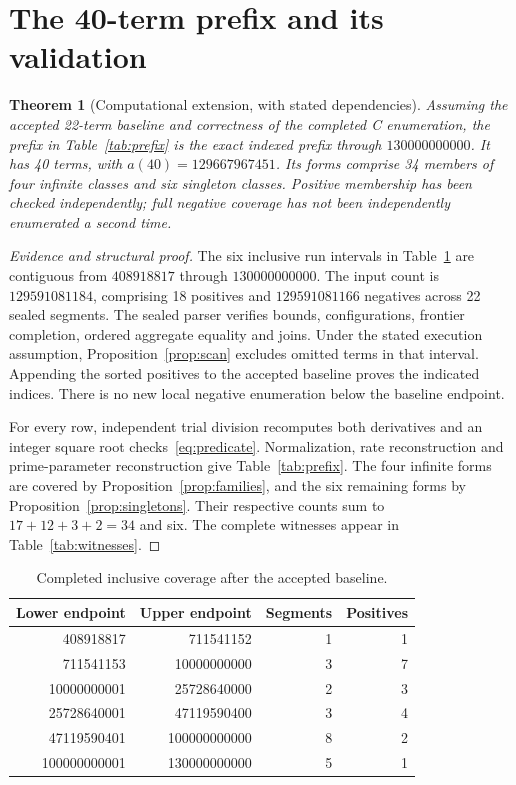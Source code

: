 \documentclass[11pt]{article}
\newtheorem{theorem}{Theorem}[section]
\theoremstyle{definition}
\begin{document}
\section{The 40-term prefix and its validation}\label{sec:extension}
\begin{theorem}[Computational extension, with stated dependencies]
\label{thm:extension}
Assuming the accepted 22-term baseline and correctness of the completed C
enumeration, the prefix in Table~\ref{tab:prefix} is the exact indexed
prefix through $130000000000$. It has 40 terms, with
$a(40)=129667967451$. Its forms comprise 34 members of four infinite
classes and six singleton classes. Positive membership has been checked
independently; full negative coverage has not been independently
enumerated a second time.
\end{theorem}
\begin{proof}[Evidence and structural proof]
The six inclusive run intervals in Table~\ref{tab:coverage} are contiguous
from $408918817$ through $130000000000$. The input count is
$129591081184$, comprising 18 positives and $129591081166$ negatives
across 22 sealed segments.
The sealed parser verifies bounds, configurations, frontier completion,
ordered aggregate equality and joins. Under the stated execution
assumption, Proposition~\ref{prop:scan} excludes omitted terms in that
interval. Appending the sorted positives to the accepted baseline proves
the indicated indices. There is no new local negative enumeration below
the baseline endpoint.

For every row, independent trial division recomputes both derivatives
and an integer square root checks~\eqref{eq:predicate}. Normalization,
rate reconstruction and prime-parameter reconstruction give
Table~\ref{tab:prefix}. The four infinite forms are covered by
Proposition~\ref{prop:families}, and the six remaining forms by
Proposition~\ref{prop:singletons}. Their respective counts sum to
$17+12+3+2=34$ and six. The complete witnesses appear in
Table~\ref{tab:witnesses}.
\end{proof}

\begin{table}[ht]
\centering\small
\begin{tabular}{rr rr}
\toprule
Lower endpoint & Upper endpoint & Segments & Positives\\
\midrule
408918817 & 711541152 & 1 & 1\\
711541153 & 10000000000 & 3 & 7\\
10000000001 & 25728640000 & 2 & 3\\
25728640001 & 47119590400 & 3 & 4\\
47119590401 & 100000000000 & 8 & 2\\
100000000001 & 130000000000 & 5 & 1\\
\bottomrule
\end{tabular}
\caption{Completed inclusive coverage after the accepted baseline.}
\label{tab:coverage}
\end{table}
\end{document}
